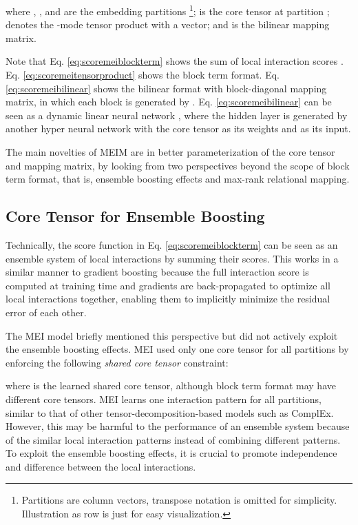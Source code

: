 \documentclass{article}
\theoremstyle{plain}
\theoremstyle{remark}
\begin{document}
where , , and  are the embedding partitions  \footnote{Partitions are column vectors, transpose notation is omitted for simplicity. Illustration as row is just for easy visualization.};  is the core tensor at partition ;  denotes the -mode tensor product with a vector; and  is the bilinear mapping matrix. 

Note that Eq. \ref{eq:scoremeiblockterm} shows the sum of local interaction scores . Eq. \ref{eq:scoremeitensorproduct} shows the block term format. Eq. \ref{eq:scoremeibilinear} shows the bilinear format with block-diagonal mapping matrix, in which each block  is generated by . Eq. \ref{eq:scoremeibilinear} can be seen as a dynamic linear neural network \cite{tran_multipartitionembeddinginteraction_2020}, where the hidden layer  is generated by another hyper neural network \cite{ha_hypernetworks_2016} with the core tensor  as its weights and  as its input.

The main novelties of MEIM are in better parameterization of the core tensor and mapping matrix, by looking from two perspectives beyond the scope of block term format, that is, ensemble boosting effects and max-rank relational mapping.

\subsection{Core Tensor for Ensemble Boosting} \label{sect:model_nonsharedcore} Technically, the score function in Eq. \ref{eq:scoremeiblockterm} can be seen as an ensemble system of  local interactions by summing their scores. This works in a similar manner to gradient boosting \cite{mason_boostingalgorithmsgradient_1999} because the full interaction score is computed at training time and gradients are back-propagated to optimize all local interactions together, enabling them to implicitly minimize the residual error of each other. 



The MEI model briefly mentioned this perspective but did not actively exploit the ensemble boosting effects. MEI used only one core tensor for all partitions by enforcing the following \textit{shared core tensor} constraint:

where  is the learned shared core tensor, although block term format may have different core tensors. MEI learns one interaction pattern for all partitions, similar to that of other tensor-decomposition-based models such as ComplEx. However, this may be harmful to the performance of an ensemble system because of the similar local interaction patterns instead of combining different patterns. To exploit the ensemble boosting effects, it is crucial to promote independence and difference between the local interactions. 
\end{document}
